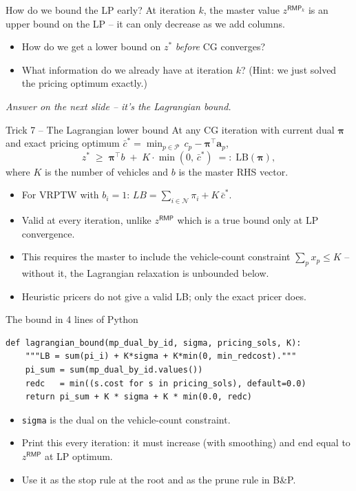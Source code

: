 \documentclass[10pt,aspectratio=169]{beamer}
\newcommand{\rmp}{\mathsf{RMP}}
\newcommand{\redcost}{\bar{c}}
\begin{document}
\begin{frame}{How do we bound the LP early?}
  At iteration $k$, the master value $z^{\rmp_k}$ is an \alert{upper}
  bound on the LP -- it can only decrease as we add columns.
  \medskip
  \begin{keybox}[Question]
    \begin{itemize}
      \item How do we get a \alert{lower} bound on $z^*$ \emph{before} CG
            converges?
      \item What information do we already have at iteration $k$?
            (Hint: we just solved the pricing optimum exactly.)
    \end{itemize}
  \end{keybox}
  \medskip
  \emph{Answer on the next slide -- it's the Lagrangian bound.}
\end{frame}

\begin{frame}{Trick 7 -- The Lagrangian lower bound}
  At any CG iteration with current dual $\boldsymbol\pi$ and exact pricing
  optimum
  $\redcost^{*} = \min_{p\in\mathcal P}\,c_p-\boldsymbol\pi^{\!\top}\!\mathbf a_p$,
  \[
    z^* \;\ge\; \boldsymbol\pi^{\!\top}b
                \;+\; K\cdot \min(0,\,\redcost^{*})
        \;=:\;\text{LB}(\boldsymbol\pi),
  \]
  where $K$ is the number of vehicles and $b$ is the master RHS vector.
  \begin{itemize}\small
    \item For VRPTW with $b_i\!=\!1$: $LB = \sum_{i\in\mathcal N}\pi_i + K\,\redcost^{*}$.
    \item Valid \alert{at every iteration}, unlike $z^{\rmp}$ which is a true bound only at LP convergence.
    \item This requires the master to include the
          \alert{vehicle-count constraint} $\sum_p x_p\le K$ -- without it,
          the Lagrangian relaxation is unbounded below.
    \item Heuristic pricers do \alert{not} give a valid LB; only the exact
          pricer does.
  \end{itemize}
\end{frame}

\begin{frame}[fragile]{The bound in 4 lines of Python}
\begin{lstlisting}
def lagrangian_bound(mp_dual_by_id, sigma, pricing_sols, K):
    """LB = sum(pi_i) + K*sigma + K*min(0, min_redcost)."""
    pi_sum = sum(mp_dual_by_id.values())
    redc   = min((s.cost for s in pricing_sols), default=0.0)
    return pi_sum + K * sigma + K * min(0.0, redc)
\end{lstlisting}
  \begin{itemize}\small
    \item \texttt{sigma} is the dual on the vehicle-count constraint.
    \item Print this every iteration: it must increase (with smoothing)
          and end equal to $z^{\rmp}$ at LP optimum.
    \item Use it as the \alert{stop rule} at the root and as the
          \alert{prune rule} in B\&P.
  \end{itemize}
\end{frame}
\end{document}
